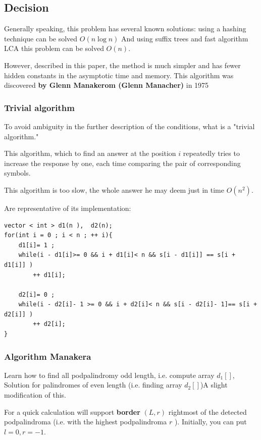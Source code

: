 \subsection{ Decision }

Generally speaking, this problem has several known solutions: using a hashing technique can be solved $O (n \log n)$ And using suffix trees and fast algorithm LCA this problem can be solved $O (n)$.

However, described in this paper, the method is much simpler and has fewer hidden constants in the asymptotic time and memory. This algorithm was discovered \textbf{by Glenn Manakerom (Glenn Manacher)} in 1975

\subsubsection{ Trivial algorithm }

To avoid ambiguity in the further description of the conditions, what is a "trivial algorithm."

This algorithm, which to find an answer at the position $i$ repeatedly tries to increase the response by one, each time comparing the pair of corresponding symbols.

This algorithm is too slow, the whole answer he may deem just in time $O (n ^ 2)$.

Are representative of its implementation:

\begin{verbatim}
vector < int > d1(n ),  d2(n);
for(int i = 0 ; i < n ; ++ i){
    d1[i]= 1 ;
    while(i - d1[i]>= 0 && i + d1[i]< n && s[i - d1[i]] == s[i + d1[i]] )
        ++ d1[i];
 
    d2[i]= 0 ;
    while(i - d2[i]- 1 >= 0 && i + d2[i]< n && s[i - d2[i]- 1]== s[i + d2[i]] )
        ++ d2[i];
} 
\end{verbatim}
\subsubsection{ Algorithm Manakera }

Learn how to find all podpalindromy odd length, i.e. compute array $d_1 []$, Solution for palindromes of even length (i.e. finding array $d_2 []$)A slight modification of this.

For a quick calculation will support \textbf{border} \textbf{$(L, r)$} rightmost of the detected podpalindroma (i.e. with the highest podpalindroma $r$ ). Initially, you can put $l = 0, r = -1$.

